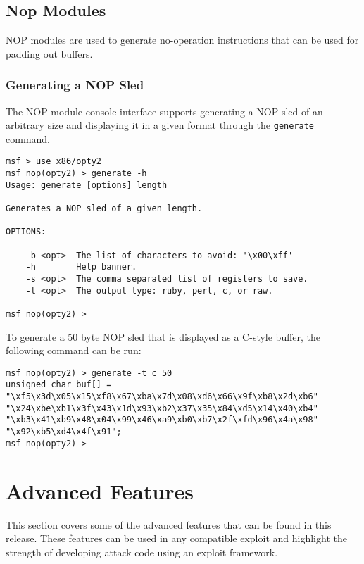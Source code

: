 \documentclass{report}
\begin{document}
	\section{Nop Modules}

\par
NOP modules are used to generate no-operation instructions that can be used
for padding out buffers.

		\subsection{Generating a NOP Sled}

\par
The NOP module console interface supports generating a NOP sled of an
arbitrary size and displaying it in a given format through the
\texttt{generate} command.

\begin{verbatim}
msf > use x86/opty2
msf nop(opty2) > generate -h
Usage: generate [options] length

Generates a NOP sled of a given length.

OPTIONS:

    -b <opt>  The list of characters to avoid: '\x00\xff'
    -h        Help banner.
    -s <opt>  The comma separated list of registers to save.
    -t <opt>  The output type: ruby, perl, c, or raw.

msf nop(opty2) >     
\end{verbatim}

\par
To generate a 50 byte NOP sled that is displayed as a C-style buffer, the
following command can be run:

\begin{verbatim}
msf nop(opty2) > generate -t c 50
unsigned char buf[] =
"\xf5\x3d\x05\x15\xf8\x67\xba\x7d\x08\xd6\x66\x9f\xb8\x2d\xb6"
"\x24\xbe\xb1\x3f\x43\x1d\x93\xb2\x37\x35\x84\xd5\x14\x40\xb4"
"\xb3\x41\xb9\x48\x04\x99\x46\xa9\xb0\xb7\x2f\xfd\x96\x4a\x98"
"\x92\xb5\xd4\x4f\x91";
msf nop(opty2) >   
\end{verbatim}

\pagebreak
\chapter{Advanced Features}

\par
This section covers some of the advanced features that can be found in this
release. These features can be used in any compatible exploit and highlight
the strength of developing attack code using an exploit framework. 
\end{document}
